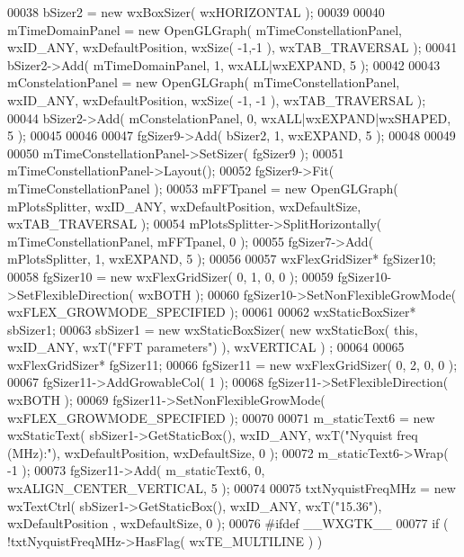 \begin{DoxyCode}
00038     bSizer2 = \textcolor{keyword}{new} wxBoxSizer( wxHORIZONTAL );
00039     
00040     mTimeDomainPanel = \textcolor{keyword}{new} OpenGLGraph( mTimeConstellationPanel, wxID\_ANY, wxDefaultPosition, wxSize( -1,-1
       ), wxTAB\_TRAVERSAL );
00041     bSizer2->Add( mTimeDomainPanel, 1, wxALL|wxEXPAND, 5 );
00042     
00043     mConstelationPanel = \textcolor{keyword}{new} OpenGLGraph( mTimeConstellationPanel, wxID\_ANY, wxDefaultPosition, wxSize( -1,
      -1 ), wxTAB\_TRAVERSAL );
00044     bSizer2->Add( mConstelationPanel, 0, wxALL|wxEXPAND|wxSHAPED, 5 );
00045     
00046     
00047     fgSizer9->Add( bSizer2, 1, wxEXPAND, 5 );
00048     
00049     
00050     mTimeConstellationPanel->SetSizer( fgSizer9 );
00051     mTimeConstellationPanel->Layout();
00052     fgSizer9->Fit( mTimeConstellationPanel );
00053     mFFTpanel = \textcolor{keyword}{new} OpenGLGraph( mPlotsSplitter, wxID\_ANY, wxDefaultPosition, wxDefaultSize, 
      wxTAB\_TRAVERSAL );
00054     mPlotsSplitter->SplitHorizontally( mTimeConstellationPanel, mFFTpanel, 0 );
00055     fgSizer7->Add( mPlotsSplitter, 1, wxEXPAND, 5 );
00056     
00057     wxFlexGridSizer* fgSizer10;
00058     fgSizer10 = \textcolor{keyword}{new} wxFlexGridSizer( 0, 1, 0, 0 );
00059     fgSizer10->SetFlexibleDirection( wxBOTH );
00060     fgSizer10->SetNonFlexibleGrowMode( wxFLEX\_GROWMODE\_SPECIFIED );
00061     
00062     wxStaticBoxSizer* sbSizer1;
00063     sbSizer1 = \textcolor{keyword}{new} wxStaticBoxSizer( \textcolor{keyword}{new} wxStaticBox( \textcolor{keyword}{this}, wxID\_ANY, wxT(\textcolor{stringliteral}{"FFT parameters"}) ), wxVERTICAL )
      ;
00064     
00065     wxFlexGridSizer* fgSizer11;
00066     fgSizer11 = \textcolor{keyword}{new} wxFlexGridSizer( 0, 2, 0, 0 );
00067     fgSizer11->AddGrowableCol( 1 );
00068     fgSizer11->SetFlexibleDirection( wxBOTH );
00069     fgSizer11->SetNonFlexibleGrowMode( wxFLEX\_GROWMODE\_SPECIFIED );
00070     
00071     m_staticText6 = \textcolor{keyword}{new} wxStaticText( sbSizer1->GetStaticBox(), wxID\_ANY, wxT(\textcolor{stringliteral}{"Nyquist freq (MHz):"}), 
      wxDefaultPosition, wxDefaultSize, 0 );
00072     m_staticText6->Wrap( -1 );
00073     fgSizer11->Add( m_staticText6, 0, wxALIGN\_CENTER\_VERTICAL, 5 );
00074     
00075     txtNyquistFreqMHz = \textcolor{keyword}{new} wxTextCtrl( sbSizer1->GetStaticBox(), wxID\_ANY, wxT(\textcolor{stringliteral}{"15.36"}), wxDefaultPosition
      , wxDefaultSize, 0 );
00076 \textcolor{preprocessor}{    #ifdef \_\_WXGTK\_\_}
00077     \textcolor{keywordflow}{if} ( !txtNyquistFreqMHz->HasFlag( wxTE\_MULTILINE ) )

\end{DoxyCode}
